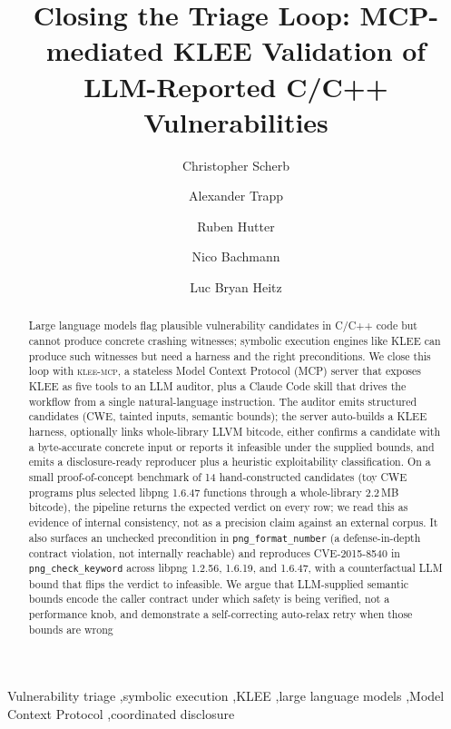\documentclass[3p,times,procedia]{elsarticle}
\begin{document}
\begin{frontmatter}


\title{Closing the Triage Loop: MCP-mediated KLEE Validation of LLM-Reported C/C++ Vulnerabilities}

\author[a]{Christopher Scherb}
\author[a]{Alexander Trapp}
\author[a]{Ruben Hutter}
\author[a]{Nico Bachmann}
\author[a]{Luc Bryan Heitz}

\address[a]{University of Applied Sciences and Arts Northwestern Switzerland, Bahnhofstrasse 6, 5210 Windisch, Switzerland}

\begin{abstract}
Large language models flag plausible vulnerability candidates in C/C++ code but cannot produce concrete crashing witnesses; symbolic execution engines like KLEE can produce such witnesses but need a harness and the right preconditions. We close this loop with \textsc{klee-mcp}, a stateless Model Context Protocol (MCP) server that exposes KLEE as five tools to an LLM auditor, plus a Claude Code skill that drives the workflow from a single natural-language instruction. The auditor emits structured candidates (CWE, tainted inputs, semantic bounds); the server auto-builds a KLEE harness, optionally links whole-library LLVM bitcode, either confirms a candidate with a byte-accurate concrete input or reports it infeasible under the supplied bounds, and emits a disclosure-ready reproducer plus a heuristic exploitability classification. On a small proof-of-concept benchmark of 14 hand-constructed candidates (toy CWE programs plus selected libpng 1.6.47 functions through a whole-library 2.2\,MB bitcode), the pipeline returns the expected verdict on every row; we read this as evidence of internal consistency, not as a precision claim against an external corpus. It also surfaces an unchecked precondition in \texttt{png\_format\_number} (a defense-in-depth contract violation, not internally reachable) and reproduces CVE-2015-8540 in \texttt{png\_check\_keyword} across libpng 1.2.56, 1.6.19, and 1.6.47, with a counterfactual LLM bound that flips the verdict to infeasible. We argue that LLM-supplied semantic bounds encode the caller contract under which safety is being verified, not a performance knob, and demonstrate a self-correcting auto-relax retry when those bounds are wrong
\end{abstract}

\begin{keyword}
Vulnerability triage \sep symbolic execution \sep KLEE \sep large language models \sep Model Context Protocol \sep coordinated disclosure
\end{keyword}
\end{frontmatter}
\end{document}
